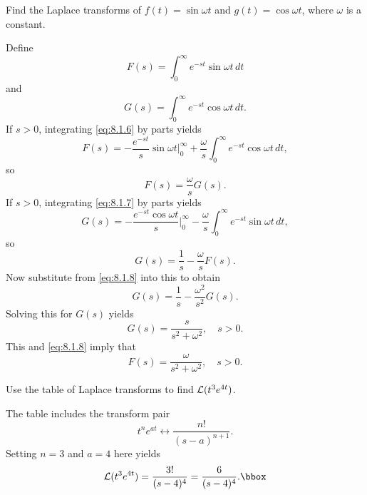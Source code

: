 \setcounter{example}{3}
\begin{example}
  \label{example:8.1.4}\rm Find the Laplace transforms of $f(t)=\sin\omega t$ and
  $g(t)=\cos\omega t$, where $\omega$ is a constant.
\end{example}
\setcounter{equation}{5}
\begin{examplesolution}
\solution Define
\begin{equation}
  \label{eq:8.1.6}F(s)=\int_{0}^{\infty}e^{-st}\sin\omega t\,dt
\end{equation}
and
\begin{equation}
  \label{eq:8.1.7}G(s)=\int_{0}^{\infty}e^{-st}\cos\omega t\,dt.
\end{equation}
If $s>0$, integrating \eqref{eq:8.1.6} by parts yields
\[
  F(s)=-\frac{e^{-st}}{s}\sin\omega t\Big|_{0}^{\infty}+\frac{\omega}{s}\int_{0}^{\infty}e^{-st}\cos\omega t\,dt,
\]
so
\begin{equation}
  \label{eq:8.1.8}F(s)=\frac{\omega}{s}G(s).
\end{equation}
If $s>0$, integrating \eqref{eq:8.1.7} by parts yields
\[
  G(s)=-\frac{e^{-st}\cos\omega t}{s}\Big|_{0}^{\infty}-\frac{\omega}{s}\int_{0}^{\infty}e^{-st}\sin\omega t\,dt,
\]
so
\[
  G(s)=\frac{1}{s}-\frac{\omega}{s}F(s).
\]
Now substitute from \eqref{eq:8.1.8} into this to obtain
\[
  G(s)=\frac{1}{s}-\frac{\omega^{2}}{s^{2}}G(s).
\]
Solving this for $G(s)$ yields
\[
  G(s)=\frac{s}{s^{2}+\omega^{2}},\quad s>0.
\]
This and \eqref{eq:8.1.8} imply that
\[
  F(s)=\frac{\omega}{s^{2}+\omega^{2}},\quad s>0.
\]
\end{examplesolution}

\setcounter{example}{4}
\begin{example}
  \label{example:8.1.5}\rm Use the table of Laplace transforms to find ${\cal L}(t^{3}e^{4t})$.
\end{example}
\begin{examplesolution}
\solution The table includes the transform pair
\[
  t^{n}e^{at}\leftrightarrow\frac{n!}{(s-a)^{n+1}}.
\]
Setting $n=3$ and $a=4$ here yields
\[
  {\cal L}(t^{3}e^{4t})=\frac{3!}{(s-4)^{4}}=\frac{6}{(s-4)^{4}}.\bbox
\]
\end{examplesolution}

